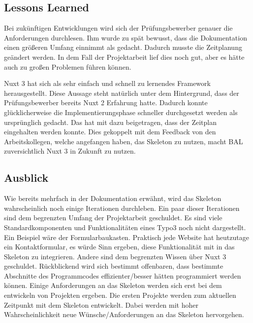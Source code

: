 \subsection{Lessons Learned}
\label{sec:LessonsLearned}

Bei zukünftigen Entwicklungen wird sich der Prüfungsbewerber genauer die Anforderungen durchlesen. Ihm wurde zu spät bewusst, dass die Dokumentation einen größeren Umfang einnimmt als gedacht. Dadurch musste die Zeitplanung geändert werden. In dem Fall der Projektarbeit lief dies noch gut, aber es hätte auch zu großen Problemen führen können.

Nuxt 3 hat sich als sehr einfach und schnell zu lernendes Framework herausgestellt. Diese Aussage steht natürlich unter dem Hintergrund, dass der Prüfungsbewerber bereits Nuxt 2 Erfahrung hatte. Dadurch konnte glücklicherweise die Implementierungsphase schneller durchgesetzt werden als ursprünglich gedacht. Das hat mit dazu beigetragen, dass der Zeitplan eingehalten werden konnte. Dies gekoppelt mit dem Feedback von den Arbeitskollegen, welche angefangen haben, das Skeleton zu nutzen, macht \acs{BAL} zuversichtlich Nuxt 3 in Zukunft zu nutzen.

\subsection{Ausblick}
\label{sec:Ausblick}

Wie bereits mehrfach in der Dokumentation erwähnt, wird das Skeleton wahrscheinlich noch einige Iterationen durchleben. Ein paar dieser Iterationen sind dem begrenzten Umfang der Projektarbeit geschuldet. Es sind viele Standardkomponenten und Funktionalitäten eines Typo3 noch nicht dargestellt. Ein Beispiel wäre der Formularbaukasten. Praktisch jede Website hat heutzutage ein Kontaktformular, es würde Sinn ergeben, diese Funktionalität mit in das Skeleton zu integrieren. Andere sind dem begrenzten Wissen über Nuxt 3 geschuldet. Rückblickend wird sich bestimmt offenbaren, dass bestimmte Abschnitte des Programmcodes effizienter/besser hätten programmiert werden können. Einige Anforderungen an das Skeleton werden sich erst bei dem entwickeln von Projekten ergeben. Die ersten Projekte werden zum aktuellen Zeitpunkt mit dem Skeleton entwickelt. Dabei werden mit hoher Wahrscheinlichkeit neue Wünsche/Anforderungen an das Skeleton hervorgehen.
